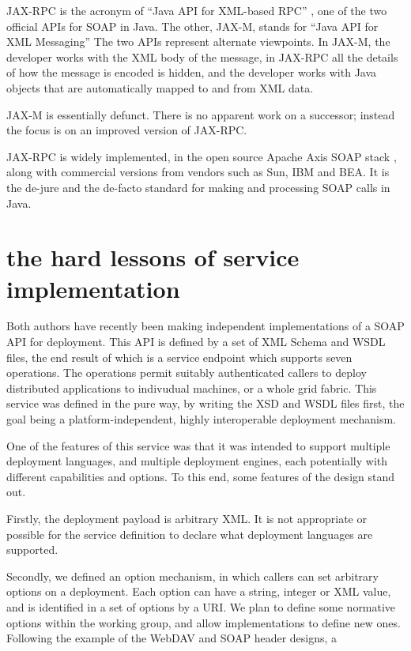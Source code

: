 \documentclass[draft]{article}
\begin{document}
JAX-RPC is the acronym of ``Java API for XML-based RPC'' \cite{spec:JAX-RPC-11}, 
one of the two official APIs for SOAP in Java. 
The other, JAX-M, stands for ``Java API for XML Messaging'' \cite{spec:JAX-M-11}
The two APIs represent alternate viewpoints. In JAX-M, the developer works with the
XML body of the message, in JAX-RPC all the details of how the message is encoded
is hidden, and the developer works with Java objects that are automatically mapped
to and from XML data. 

JAX-M is essentially defunct. There is no apparent work on a successor;
instead the focus is on an improved version of JAX-RPC. 

JAX-RPC is widely implemented, in the open source Apache Axis SOAP stack \cite{axis},
along with commercial versions from vendors such as Sun, IBM and BEA. It is the de-jure
and the de-facto standard for making and processing SOAP calls in Java. 


\section{the hard lessons of service implementation}

Both authors have recently been making independent implementations of a SOAP API
for deployment. This API is defined by a set of XML Schema and WSDL files, the
end result of which is a service endpoint which supports seven operations. The 
operations permit suitably authenticated callers to deploy distributed applications
to indivudual machines, or a whole grid fabric. This service was defined in the pure way, 
by writing the XSD and WSDL files first, the goal being a platform-independent, highly
interoperable deployment mechanism. 

One of the features of this service was that it was intended to support 
multiple deployment languages, and multiple deployment engines, each potentially
with different capabilities and options. To this end, some features of the design
stand out. 

Firstly, the deployment payload is arbitrary XML. It is not appropriate 
or possible for the service definition to declare what deployment languages are 
supported. 

Secondly, we defined an option mechanism, in which callers can set
arbitrary options on a deployment. Each option can have a string, integer or XML value,
and is identified in a set of options by a URI. We plan to define some normative options
within the working group, and allow implementations to define new ones. 
Following the example of the WebDAV and SOAP header designs, a 
\end{document}
